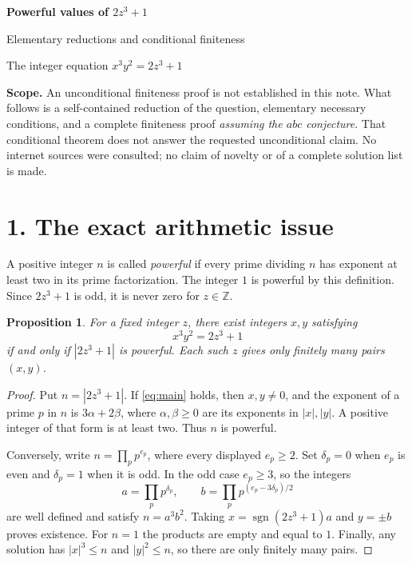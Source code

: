 \documentclass[11pt,a4paper]{article}
\newtheorem{proposition}{Proposition}
\newcommand{\Z}{\mathbb Z}
\begin{document}
\thispagestyle{plain}
\begin{center}
{\LARGE\bfseries\color{ink} Powerful values of $2z^3+1$}\par
\vspace{5pt}
{\large Elementary reductions and conditional finiteness}\par
\vspace{5pt}
{\small The integer equation $x^3y^2=2z^3+1$}
\end{center}
\vspace{5pt}
\textbf{Scope.} An unconditional finiteness proof is not established in this
note. What follows is a self-contained reduction of the question, elementary
necessary conditions, and a complete finiteness proof \emph{assuming the
$abc$ conjecture}. That conditional theorem does not answer the requested
unconditional claim. No internet sources were consulted; no claim of novelty
or of a complete solution list is made.

\section*{1. The exact arithmetic issue}
A positive integer $n$ is called \emph{powerful} if every prime dividing $n$
has exponent at least two in its prime factorization. The integer $1$ is
powerful by this definition. Since $2z^3+1$ is odd, it is never zero for
$z\in\Z$.

\begin{proposition}\label{prop:powerful}
For a fixed integer $z$, there exist integers $x,y$ satisfying
\begin{equation}\label{eq:main}
 x^3y^2=2z^3+1
\end{equation}
if and only if $|2z^3+1|$ is powerful. Each such $z$ gives only finitely
many pairs $(x,y)$.
\end{proposition}
\begin{proof}
Put $n=|2z^3+1|$. If \eqref{eq:main} holds, then $x,y\ne0$, and the exponent
of a prime $p$ in $n$ is $3\alpha+2\beta$, where $\alpha,\beta\ge0$ are its
exponents in $|x|,|y|$. A positive integer of that form is at least two.
Thus $n$ is powerful.

Conversely, write $n=\prod_p p^{e_p}$, where every displayed $e_p\ge2$.
Set $\delta_p=0$ when $e_p$ is even and $\delta_p=1$ when it is odd. In
the odd case $e_p\ge3$, so the integers
\[
 a=\prod_p p^{\delta_p},\qquad
 b=\prod_p p^{(e_p-3\delta_p)/2}
\]
are well defined and satisfy $n=a^3b^2$. Taking
$x=\operatorname{sgn}(2z^3+1)a$ and $y=\pm b$ proves existence.
For $n=1$ the products are empty and equal to $1$.
Finally, any solution has $|x|^3\le n$ and $|y|^2\le n$, so there are
only finitely many pairs.
\end{proof}
\end{document}
